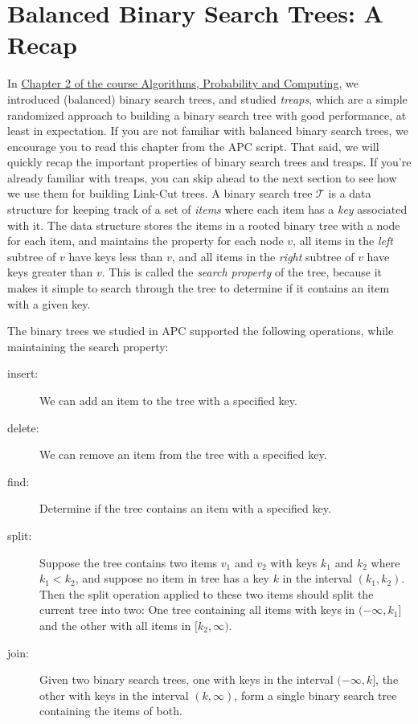 \section{Balanced Binary Search Trees: A Recap}
In \href{https://kyng.inf.ethz.ch/courses/APC21/Chapter_2.pdf}{Chapter 2 of the course Algorithms, Probability and Computing}, we introduced (balanced) binary search trees, and studied \emph{treaps}, which are a simple randomized approach to building a binary search tree with good performance, at least in expectation.
If you are not familiar with balanced binary search trees, we encourage you to read this chapter from the APC script. 
That said, we will quickly recap the important properties of binary search trees and treaps.
If you're already familiar with treaps, you can skip ahead to the next section to see how we use them for building Link-Cut trees.
%
A binary search tree $\mathcal{T}$ is a data structure for keeping track of a set of \emph{items} where each item has a \emph{key} associated with it.
The data structure stores the items in a rooted binary tree with a node for each item, and maintains the property for each node $v$, all items in the \emph{left} subtree of $v$ have keys less than $v$, and all items in the \emph{right} subtree of $v$ have keys greater than $v$.
This is called the \emph{search property} of the tree, because it makes it simple to search through the tree to determine if it contains an item with a given key.

The binary trees we studied in APC supported the following operations, while maintaining the search property:
\begin{description}
\item[insert:] We can add an item to the tree with a specified key.
\item[delete:] We can remove an item from the tree with a specified key.
\item[find:] Determine if the tree contains an item with a specified key.
\item[split:] Suppose the tree contains two items $v_1$ and $v_2$ with keys $k_1$ and $k_2$ where $k_1 < k_2$, and suppose no item in tree has a key $k$ in the interval $(k_1,k_2)$. Then the split operation applied to these two items should split the current tree into two: One tree containing all items with keys in $(-\infty,k_1]$ and the other with all items in $[k_2,\infty)$.
\item[join:] Given two binary search trees, one with keys in the interval $(-\infty,k]$, the other with keys in the interval $(k,\infty)$, form a single binary search tree containing the items of both.
\end{description}

